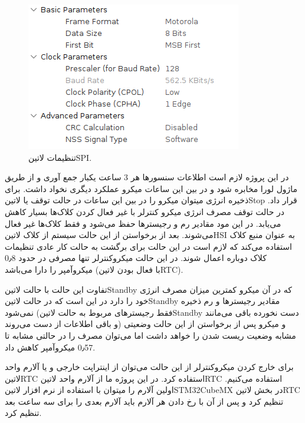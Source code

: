 \begin{figure}[H]
	\centering
	\includegraphics[width=0.6\linewidth]{Assets/SPIConfig.png}
	\caption{تنظیمات ‌لاتین{SPI}.}
	\label{fig:SPIConfig}
\end{figure}
در این پروژه لازم است اطلاعات سنسور‌ها هر 3 ساعت یکبار جمع آوری و از طریق ماژول لورا مخابره شود و در بین این ساعات میکرو عملکرد دیگری نخواد داشت. برای ذخیره انرژی میتوان میکرو را در بین این ساعات در حالت توقف یا ‌لاتین{Stop} قرار داد. در حالت توقف مصرف انرژی میکرو کنترلر با غیر فعال کردن کلاک‌ها بسیار کاهش می‌یابد. در این مود مقادیر رم و رجیستر‌ها حفظ می‌شود و فقط کلاک‌ها غیر فعال می‌شوند. بعد از برخواستن از این حالت سیستم از کلاک ‌لاتین{HSI} به عنوان منبع کلاک استفاده می‌کند که لازم است در این حالت برای برگشت به حالت کار عادی تنظیمات کلاک دوباره اعمال شوند. در این حالت میکروکنترلر تنها مصرفی در حدود 0٫8 میکروآمپر را دارا می‌باشد (با فعال بودن ‌لاتین{RTC}). 

تفاوت این حالت با حالت ‌لاتین{Standby} که در آن میکرو کمترین میزان مصرف انرژی خود را دارد در این است که در حالت ‌لاتین{Standby} مقادیر رجیستر‌ها و رم ذخیره نمی‌شود (فقط رجیستر‌های مربوط به حالت ‌لاتین{Standby} دست نخورده باقی می‌مانند و باقی اطلاعات از دست می‌روند) و میکرو پس از برخواستن از این حالت وضعیتی مشابه وضعیت ریست شدن را خواهد داشت اما می‌توان مصرف را در حالتی مشابه تا 0٫57 میکرو‌آمپر کاهش داد.

برای خارج کردن میکروکنترلر از این حالت می‌توان از اینتراپت خارجی و یا آلارم واحد ‌لاتین{RTC} استفاده کرد. در این پروژه ما از آلارم واحد ‌لاتین{RTC} استفاده می‌کنیم. اولین آلارم را میتوان با استفاده از نرم افزار ‌لاتین{STM32CubeMX} در بخش ‌لاتین{RTC} تنظیم کرد و پس از آن با رخ دادن هر آلارم باید آلارم بعدی را برای سه ساعت بعد تنظیم کرد. 



